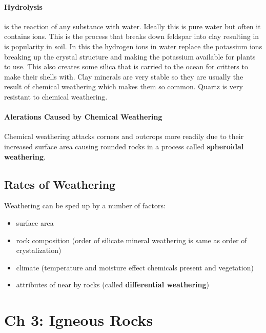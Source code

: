 \documentclass{article}
\begin{document}
\paragraph{Hydrolysis} %
\label{par:hydrolysis}
is the reaction of any substance with water. Ideally this is pure water but often it contains ions. This is the process that breaks down feldspar into clay resulting in is popularity in soil. In this the hydrogen ions in water replace the potassium ions breaking up the crystal structure and making the potassium available for plants to use. This also creates some silica that is carried to the ocean for critters to make their shells with. Clay minerals are very stable so they are usually the result of chemical weathering which makes them so common. Quartz is very resistant to chemical weathering.

\paragraph{Alerations Caused by Chemical Weathering} %
\label{par:alerations_caused_by_chemical_weathering}
Chemical weathering attacks corners and outcrops more readily due to their increased surface area causing rounded rocks in a process called \textbf{spheroidal weathering}.

\subsection*{Rates of Weathering} %
\label{sub:rates_of_weathering}
Weathering can be sped up by a number of factors:
\begin{itemize}
    \item surface area
    \item rock composition (order of silicate mineral weathering is same as order of crystalization)
    \item climate (temperature and moisture effect chemicals present and vegetation)
    \item attributes of near by rocks (called \textbf{differential weathering})
\end{itemize}



\section*{Ch 3: Igneous Rocks} %
\label{sec:ch_3_igneous_rocks}
\end{document}

